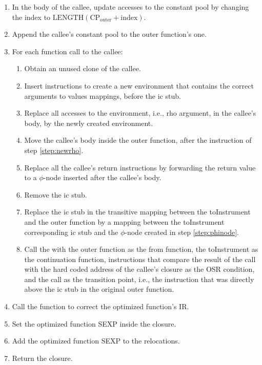 \begin{enumerate}
    \item In the body of the callee, update accesses to the constant pool by changing the index to $\text{LENGTH}(\text{CP}_{\text{outer}} + \text{index})$.
    \item Append the callee's constant pool to the outer function's one.
    \item For each function call to the callee:
        \begin{enumerate}
            \item Obtain an unused clone of the callee.
            \item Insert instructions to create a new environment that contains the correct arguments to values mappings, before the ic stub.\label{step:newrho}
            \item Replace all accesses to the environment, i.e., rho argument, in the callee's body, by the newly created environment.
            \item Move the callee's body inside the outer function, after the instruction of step \ref{step:newrho}.
            \item Replace all the callee's return instructions by forwarding the return value to a $\phi$-node inserted after the callee's body.\label{step:phinode}
            \item Remove the ic stub.
            \item Replace the ic stub in the transitive mapping between the toInstrument and the outer function by a mapping between the toInstrument corresponding ic stub and the $\phi$-node created in step \ref{step:phinode}.\label{step:updatemap}
            \item Call the  with the outer function as the from function, the toInstrument as the continuation function, instructions that compare the result of the  call with the hard coded address of the callee's closure as the OSR condition, and the  call as the transition point, i.e., the instruction that was directly above the ic stub in the original outer function.
        \end{enumerate}
    \item Call the  function to correct the optimized function's IR.
    \item Set the optimized function SEXP inside the closure.
    \item Add the optimized function SEXP to the relocations.
    \item Return the closure.
\end{enumerate}

